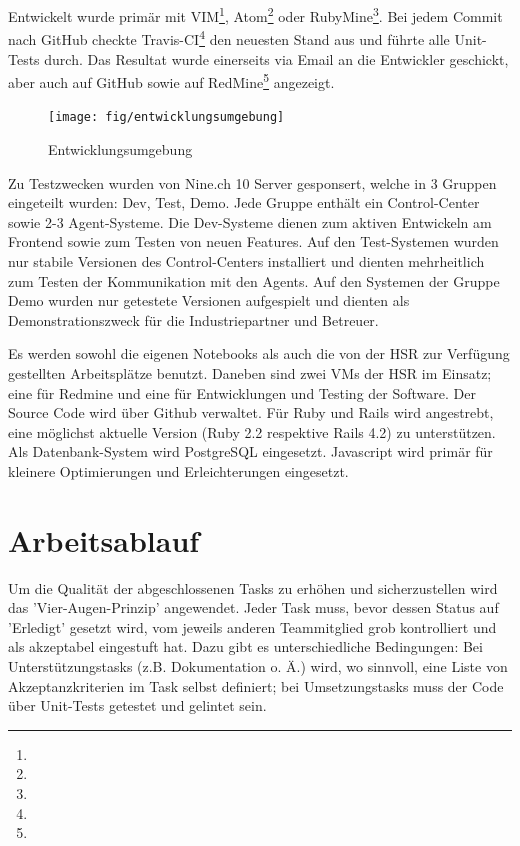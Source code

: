 Entwickelt wurde primär mit VIM\footnote{}, Atom\footnote{} oder RubyMine\footnote{}. Bei jedem Commit nach GitHub checkte Travis-CI\footnote{} den neuesten Stand aus und führte alle Unit-Tests durch. Das Resultat wurde einerseits via Email an die Entwickler geschickt, aber auch auf GitHub sowie auf RedMine\footnote{} angezeigt.

\begin{figure}[H]
	\centering
	\texttt{[image: fig/entwicklungsumgebung]}
	\caption{Entwicklungsumgebung}
	\label{fig:pm:entwicklungsumgebung}
\end{figure}

Zu Testzwecken wurden von Nine.ch 10 Server gesponsert, welche  in 3 Gruppen eingeteilt wurden: Dev, Test, Demo. Jede Gruppe enthält ein Control-Center sowie 2-3 Agent-Systeme. Die Dev-Systeme dienen zum aktiven Entwickeln am Frontend sowie zum Testen von neuen Features. Auf den Test-Systemen wurden nur stabile Versionen des Control-Centers installiert und dienten mehrheitlich zum Testen der Kommunikation mit den Agents. Auf den Systemen der Gruppe Demo wurden nur getestete Versionen aufgespielt und dienten als Demonstrationszweck für die Industriepartner und Betreuer.

Es werden sowohl die eigenen Notebooks als auch die von der HSR zur Verfügung gestellten Arbeitsplätze benutzt. Daneben sind zwei VMs der HSR im Einsatz; eine für Redmine und eine für Entwicklungen und Testing der Software. Der Source Code wird über Github verwaltet.
Für Ruby und Rails wird angestrebt, eine möglichst aktuelle Version (Ruby 2.2 respektive Rails 4.2) zu unterstützen. Als Datenbank-System wird PostgreSQL eingesetzt. Javascript wird primär für kleinere Optimierungen und Erleichterungen eingesetzt. 

\section{Arbeitsablauf}

Um die Qualität der abgeschlossenen Tasks zu erhöhen und sicherzustellen wird das 'Vier-Augen-Prinzip' angewendet. Jeder Task muss, bevor dessen Status auf 'Erledigt' gesetzt wird, vom jeweils anderen Teammitglied grob kontrolliert und als akzeptabel eingestuft hat. Dazu gibt es unterschiedliche Bedingungen: Bei Unterstützungstasks (z.B. Dokumentation o. Ä.) wird, wo sinnvoll, eine Liste von Akzeptanzkriterien im Task selbst definiert; bei Umsetzungstasks muss der Code über Unit-Tests getestet und gelintet sein.

